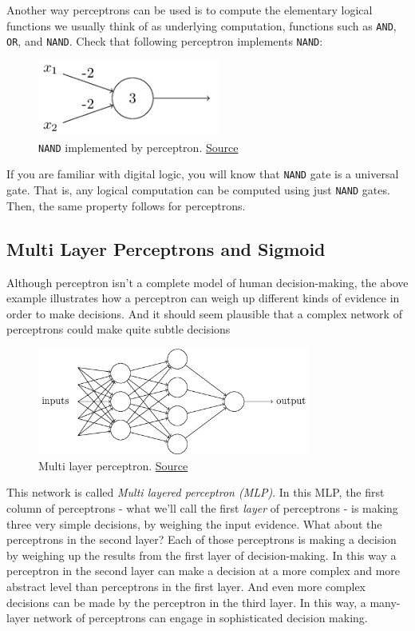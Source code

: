 \documentclass[a4paper]{tufte-handout}
\begin{document}
Another way perceptrons can be used is to compute the elementary logical
functions we usually think of as underlying computation, functions such
as \texttt{AND}, \texttt{OR}, and \texttt{NAND}. Check that following
perceptron implements \texttt{NAND}:

\begin{figure}
  \includegraphics[width=60mm]{tikz2}
  \caption{\texttt{NAND} implemented by perceptron.
\href{http://neuralnetworksanddeeplearning.com/chap1.html}{Source} }
\end{figure}

If you are familiar with digital logic, you will know that \texttt{NAND}
gate is a universal gate. That is, any logical computation can be
computed using just \texttt{NAND} gates. Then, the same property follows
for perceptrons.

\subsection{Multi Layer Perceptrons and Sigmoid}
\label{multi-layer-perceptrons-and-sigmoid}

Although perceptron isn't a complete model of human decision-making, the
above example illustrates how a perceptron can weigh up different kinds
of evidence in order to make decisions. And it should seem plausible
that a complex network of perceptrons could make quite subtle decisions

\begin{figure}
  \includegraphics[height=35mm]{tikz1}
  \caption{Multi layer perceptron.
\href{http://neuralnetworksanddeeplearning.com/chap1.html}{Source} }
\end{figure}

This network is called \emph{Multi layered perceptron (MLP)}. In this
MLP, the first column of perceptrons - what we'll call the first
\emph{layer} of perceptrons - is making three very simple decisions, by
weighing the input evidence. What about the perceptrons in the second
layer? Each of those perceptrons is making a decision by weighing up the
results from the first layer of decision-making. In this way a
perceptron in the second layer can make a decision at a more complex and
more abstract level than perceptrons in the first layer. And even more
complex decisions can be made by the perceptron in the third layer. In
this way, a many-layer network of perceptrons can engage in
sophisticated decision making.
\end{document}
